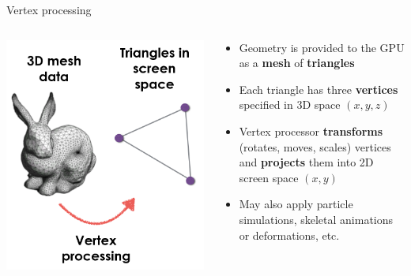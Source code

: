 \begin{frame}{Vertex processing}
	\begin{columns}
		\begin{column}{0.3\textwidth}
			\includegraphics[width=\textwidth]{pipeline_1}
		\end{column}
		\begin{column}{0.65\textwidth}
			\begin{itemize}
				\pause\item Geometry is provided to the GPU as a \textbf{mesh} of \textbf{triangles}
				\pause\item Each triangle has three \textbf{vertices} specified in 3D space $(x,y,z)$
				\pause\item Vertex processor \textbf{transforms} (rotates, moves, scales) vertices
					and \textbf{projects} them into 2D screen space $(x,y)$
				\pause\item May also apply particle simulations, skeletal animations or deformations, etc.
			\end{itemize}
		\end{column}
	\end{columns}
\end{frame}

